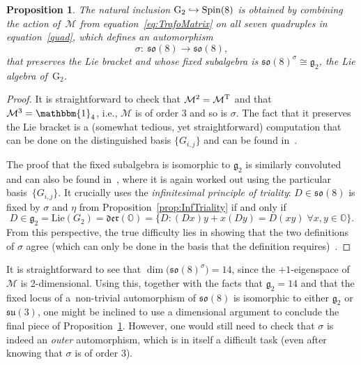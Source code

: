 \documentclass[pdftex]{sigma}
\numberwithin{equation}{section}
\newcommand{\Oct}{{\mathbb O}}
\newcommand{\GG}{{\rm G}_2}
\newtheorem{Proposition}[Theorem]{Proposition}
 { \theoremstyle{definition}
\newtheorem{Definition}[Theorem]{Definition}
\newtheorem{Remark}[Theorem]{Remark} }
\begin{document}
\begin{Proposition}\label{propf2} The natural inclusion $\GG \hookrightarrow \mathrm{Spin}(8)$ is obtained by combining the action of~$ \mathcal{M}$ from equation~\eqref{eq:TrafoMatrix} on all seven quadruples in equation~\eqref{quad}, which defines an automorphism \begin{equation} \sigma \colon \ \mathfrak{so}(8) \rightarrow \mathfrak{so}(8),\label{autosigma}\end{equation} that preserves the Lie bracket and whose fixed subalgebra is $\mathfrak{so}(8)^\sigma \cong \mathfrak{g}_2$, the Lie algebra of~$\mathrm{G}_2$.
\end{Proposition}
\begin{proof}
It is straightforward to check that $ \mathcal{M}^2 = \mathcal{M}^{\rm T}$ and that $ \mathcal{M}^3 = \mathbbm{1}_4$, i.e., $ \mathcal{M}$ is of order 3 and so is $\sigma$. The fact that it preserves the Lie bracket is a (somewhat tedious, yet straightforward) computation that can be done on the distinguished basis $\{ G_{i,j} \}$ and can be found in~\cite[Lem\-ma~1.3.2]{yokota}.

The proof that the fixed subalgebra is isomorphic to $\mathfrak{g}_2$ is similarly convoluted and can also be found in~\cite[Lemma~1.4.2]{yokota}, where it is again worked out using the particular basis~$\{ G_{i,j} \}$. It crucially uses the \textit{infinitesimal principle of triality}: $D \in \mathfrak{so}(8)$ is fixed by $\sigma$ and $\eta$ from Proposition~\ref{prop:InfTriality} if and only if
\begin{equation*}
 D \in \mathfrak{g}_2 = \textrm{Lie}(G_2) = \mathfrak{der}(\Oct) = \{ D \colon (Dx)y + x(Dy) =D(xy) \; \forall x,y \in \Oct \}.
\end{equation*}
From this perspective, the true difficulty lies in showing that the two definitions of $\sigma$ agree (which can only be done in the basis that the definition requires)~\cite{yokota}.
\end{proof}

\begin{Remark}
It is straightforward to see that $\dim \big( \mathfrak{so}(8)^\sigma \big) =14$, since the $+1$-eigenspace of~$\mathcal{M}$ is 2-dimensional. Using this, together with the facts that $\mathfrak{g}_2 = 14$ and that the fixed locus of a~non-trivial automorphism of $\mathfrak{so}(8)$ is isomorphic to either $\mathfrak{g}_2$ or $\mathfrak{su}(3)$, one might be inclined to use a dimensional argument to conclude the final piece of Proposition~\ref{propf2}. However, one would still need to check that $\sigma$ is indeed an \textit{outer} automorphism, which is in itself a difficult task (even after knowing that $\sigma$ is of order $3$).
\end{Remark}
\end{document}
